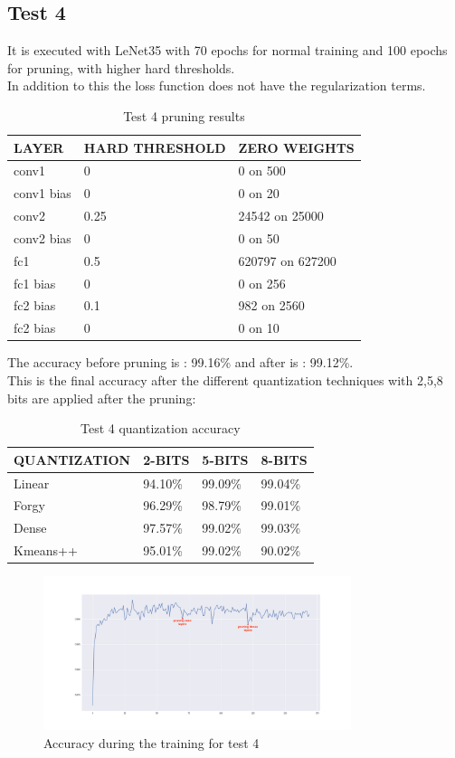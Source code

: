 \documentclass[journal]{vgtc}                %
\begin{document}
\subsection{Test 4}
It is executed with LeNet35 with 70 epochs for normal training and 100 epochs for pruning, with higher hard thresholds.\\In addition to this the loss function does not have the regularization terms.
\begin{table}[H]
\caption{Test 4 pruning results}
\label{my-label}
\begin{tabular}{|l|l|l|}
\hline
LAYER    & HARD THRESHOLD & ZERO WEIGHTS     \\ \hline
conv1      & 0         & 0 on 500 \\ \hline
conv1 bias & 0       & 0 on 20        \\ \hline
conv2      & 0.25         & 24542 on 25000   \\ \hline
conv2 bias & 0      & 0 on 50       \\ \hline
fc1      & 0.5       & 620797 on 627200      \\ \hline
fc1 bias & 0         & 0 on 256          \\ \hline
fc2 bias & 0.1         & 982 on 2560          \\ \hline
fc2 bias & 0         & 0 on 10          \\ \hline

\end{tabular}
\end{table}
The accuracy before pruning is : 99.16\% and after is : 99.12\%.\\This is the final accuracy after the different quantization techniques with 2,5,8 bits are applied after the pruning:
\begin{table}[H]
\caption{Test 4 quantization accuracy}
\label{my-label}
\begin{tabular}{|l|l|l|l|}
\hline
QUANTIZATION & 2-BITS  & 5-BITS  & 8-BITS  \\ \hline
Linear       & 94.10\% & 99.09\% & 99.04\% \\ \hline
Forgy        & 96.29\% & 98.79\% & 99.01\% \\ \hline
Dense        & 97.57\% & 99.02\% & 99.03\% \\ \hline
Kmeans++     & 95.01\% & 99.02\% & 90.02\% \\ \hline
\end{tabular}
\end{table}\begin{figure}[H]
	\includegraphics[width=90mm,scale=0.7]{accuracy-hard-threshold-conv}
	\caption{Accuracy during the training for test 4}
\end{figure}
\end{document}
